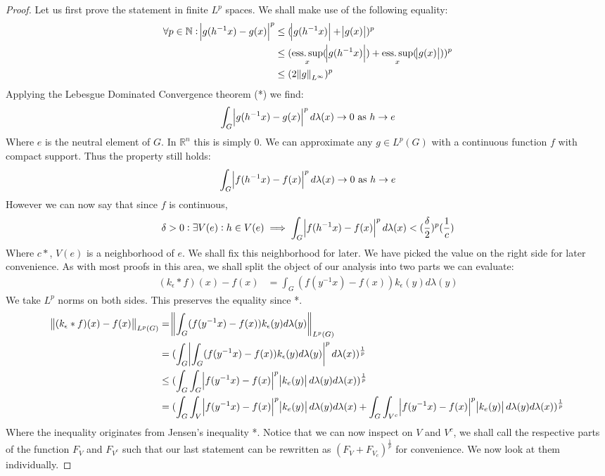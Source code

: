 \begin{proof}
Let us first prove the statement in finite $L^p$ spaces. We shall make use of the following equality:
\begin{align*}
\forall p \in \mathbb{N} : \abs{g(h^{-1}x) - g(x)}^p &\leq (\abs{g(h^{-1}x)}+\abs{g(x)})^p \\
&\leq (\esssup_x (\abs{g(h^{-1}x)} )+\esssup_x(\abs{g(x)}) )^p \\
&\leq (2\norm{g}_{L^\infty})^p
\end{align*}
Applying the Lebesgue Dominated Convergence theorem (*) we find:
\begin{align*}
\int_G \abs{g(h^{-1}x)-g(x)}^p d\lambda(x) \to 0 \text{ as } h \to e
\end{align*}
Where $e$ is the neutral element of $G$. In $\mathbb{R}^n$ this is simply $0$. We can approximate any $g \in L^p(G)$ with a continuous function $f$ with compact support. Thus the property still holds:
\begin{align*}
\int_G \abs{f(h^{-1}x)-f(x)}^p d\lambda(x) \to 0 \text{ as } h \to e
\end{align*}
However we can now say that since $f$ is continuous,
\begin{equation}
\delta > 0 : \exists V(e): h \in V(e) \implies \int_G \abs{f(h^{-1}x) - f(x)}^p d\lambda(x) < (\frac{\delta}{2})^p ( \frac{1}{c})
\end{equation}
Where $c*$, $V(e)$ is a neighborhood of $e$. We shall fix this neighborhood for later. We have picked the value on the right side for later convenience. As with most proofs in this area, we shall split the object of our analysis into two parts we can evaluate:
\begin{align*}
(k_\epsilon \ast f)(x) - f(x) &= \int_G (f(y^{-1}x)-f(x))k_\epsilon(y) d\lambda(y)
\end{align*}
We take $L^p$ norms on both sides. This preserves the equality since *.
\begin{align*}
\norm{(k_\epsilon \ast f)(x) - f(x)}_{L^p(G)} &= \norm{\int_G (f(y^{-1}x)-f(x))k_\epsilon(y) d\lambda(y)}_{L^p(G)} \\
&= (\int_G \abs{\int_G (f(y^{-1}x)-f(x))k_\epsilon(y) d\lambda(y)}^p d\lambda(x) )^{\frac{1}{p}}\\
&\leq (\int_G \int_G \abs{f(y^{-1}x)-f(x)}^p \abs{k_e(y)}  d\lambda(y) d\lambda(x) )^{\frac{1}{p}} \\
&= (\int_G \int_V \abs{f(y^{-1}x)-f(x)}^p \abs{k_e(y)} d\lambda(y) d\lambda(x) 
+ \int_G \int_{V^c} \abs{f(y^{-1}x)-f(x)}^p \abs{k_e(y)} d\lambda(y) d\lambda(x) )^{\frac{1}{p}}
\end{align*}
Where the inequality originates from Jensen's inequality *. Notice that we can now inspect on $V$ and $V^c$, we shall call the respective parts of the function $F_V$ and $F_{V^c}$ such that our last statement can be rewritten as $ ( F_V + F_{V_c} )^{\frac{1}{p}}$ for convenience. We now look at them individually. 


\end{proof}
